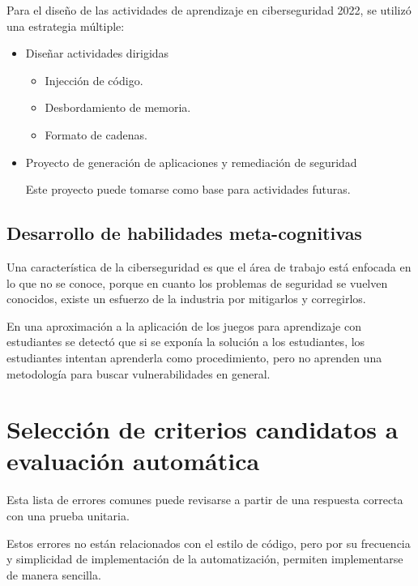 \documentclass[
  12,
]{scrartcl}
\begin{document}
Para el diseño de las actividades de aprendizaje en ciberseguridad 2022,
se utilizó una estrategia múltiple:

\begin{itemize}
\item
  Diseñar actividades dirigidas

  \begin{itemize}
  \item
    Injección de código.
  \item
    Desbordamiento de memoria.
  \item
    Formato de cadenas.
  \end{itemize}
\item
  Proyecto de generación de aplicaciones y remediación de seguridad

  Este proyecto puede tomarse como base para actividades futuras.
\end{itemize}

\hypertarget{desarrollo-de-habilidades-meta-cognitivas}{%
\subsection{Desarrollo de habilidades
meta-cognitivas}\label{desarrollo-de-habilidades-meta-cognitivas}}

Una característica de la ciberseguridad es que el área de trabajo está
enfocada en lo que no se conoce, porque en cuanto los problemas de
seguridad se vuelven conocidos, existe un esfuerzo de la industria por
mitigarlos y corregirlos.

En una aproximación a la aplicación de los juegos para aprendizaje con
estudiantes se detectó que si se exponía la solución a los estudiantes,
los estudiantes intentan aprenderla como procedimiento, pero no aprenden
una metodología para buscar vulnerabilidades en general.

\hypertarget{selecciuxf3n-de-criterios-candidatos-a-evaluaciuxf3n-automuxe1tica}{%
\section{Selección de criterios candidatos a evaluación
automática}\label{selecciuxf3n-de-criterios-candidatos-a-evaluaciuxf3n-automuxe1tica}}

Esta lista de errores comunes puede revisarse a partir de una respuesta
correcta con una prueba unitaria.

Estos errores no están relacionados con el estilo de código, pero por su
frecuencia y simplicidad de implementación de la automatización,
permiten implementarse de manera sencilla.
\end{document}
